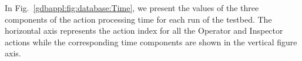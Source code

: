 In Fig.~\ref{gdbappl:fig:database:Time}, we present the values of the three components of the action processing time for each run of the testbed. The horizontal axis represents the action index for all the Operator and Inspector actions while the corresponding time components are shown in the vertical figure axis. 






